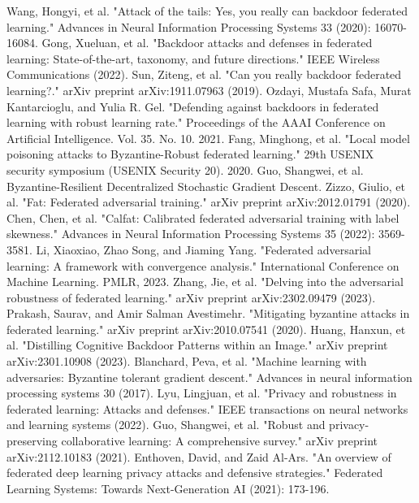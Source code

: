 \documentclass[conference]{IEEEtran}
\begin{document}
\begin{thebibliography}{00}
     Wang, Hongyi, et al. "Attack of the tails: Yes, you really can backdoor federated learning." Advances in Neural Information Processing Systems 33 (2020): 16070-16084.
     Gong, Xueluan, et al. "Backdoor attacks and defenses in federated learning: State-of-the-art, taxonomy, and future directions." IEEE Wireless Communications (2022).
     Sun, Ziteng, et al. "Can you really backdoor federated learning?." arXiv preprint arXiv:1911.07963 (2019).
     Ozdayi, Mustafa Safa, Murat Kantarcioglu, and Yulia R. Gel. "Defending against backdoors in federated learning with robust learning rate." Proceedings of the AAAI Conference on Artificial Intelligence. Vol. 35. No. 10. 2021.
     Fang, Minghong, et al. "Local model poisoning attacks to {Byzantine-Robust} federated learning." 29th USENIX security symposium (USENIX Security 20). 2020.
     Guo, Shangwei, et al. Byzantine-Resilient Decentralized Stochastic Gradient Descent.
     Zizzo, Giulio, et al. "Fat: Federated adversarial training." arXiv preprint arXiv:2012.01791 (2020).
     Chen, Chen, et al. "Calfat: Calibrated federated adversarial training with label skewness." Advances in Neural Information Processing Systems 35 (2022): 3569-3581.
     Li, Xiaoxiao, Zhao Song, and Jiaming Yang. "Federated adversarial learning: A framework with convergence analysis." International Conference on Machine Learning. PMLR, 2023.
     Zhang, Jie, et al. "Delving into the adversarial robustness of federated learning." arXiv preprint arXiv:2302.09479 (2023).
     Prakash, Saurav, and Amir Salman Avestimehr. "Mitigating byzantine attacks in federated learning." arXiv preprint arXiv:2010.07541 (2020).
     Huang, Hanxun, et al. "Distilling Cognitive Backdoor Patterns within an Image." arXiv preprint arXiv:2301.10908 (2023).
     Blanchard, Peva, et al. "Machine learning with adversaries: Byzantine tolerant gradient descent." Advances in neural information processing systems 30 (2017).
     Lyu, Lingjuan, et al. "Privacy and robustness in federated learning: Attacks and defenses." IEEE transactions on neural networks and learning systems (2022).
     Guo, Shangwei, et al. "Robust and privacy-preserving collaborative learning: A comprehensive survey." arXiv preprint arXiv:2112.10183 (2021).
     Enthoven, David, and Zaid Al-Ars. "An overview of federated deep learning privacy attacks and defensive strategies." Federated Learning Systems: Towards Next-Generation AI (2021): 173-196.

\end{thebibliography}
\end{document}
